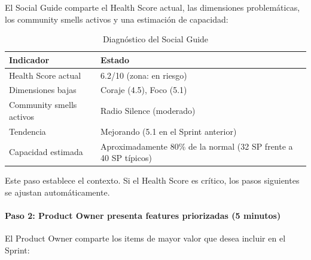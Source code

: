 El Social Guide comparte el Health Score actual, las dimensiones problemáticas, los community smells activos y una estimación de capacidad:

\begin{table}[h]
    \centering
    \small
    \begin{tabularx}{\textwidth}{|l|X|}
        \hline
        \textbf{Indicador} & \textbf{Estado}                                                  \\
        \hline
        Health Score actual
                           & 6.2/10 (zona: en riesgo)                                         \\
        \hline
        Dimensiones bajas
                           & Coraje (4.5), Foco (5.1)                                         \\
        \hline
        Community smells activos
                           & Radio Silence (moderado)                                         \\
        \hline
        Tendencia
                           & Mejorando (5.1 en el Sprint anterior)                            \\
        \hline
        Capacidad estimada
                           & Aproximadamente 80\% de la normal (32 SP frente a 40 SP típicos) \\
        \hline
    \end{tabularx}
    \caption{Diagnóstico del Social Guide}
    \label{tab:diagnostico-social-guide}
\end{table}
\FloatBarrier

Este paso establece el contexto. Si el Health Score es crítico, los pasos siguientes se ajustan automáticamente.

\paragraph{Paso 2: Product Owner presenta features priorizadas (5 minutos)}

El Product Owner comparte los items de mayor valor que desea incluir en el Sprint:

